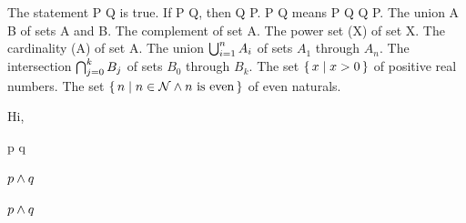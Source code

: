 \documentclass[11pt]{article}
\begin{document}
  The statement P \AND Q is true.
  If P \THEN Q, then \NOT Q \THEN \NOT P.
  P \IFF Q means P \THEN Q \AND Q \THEN P.
    
  The union A \sOR B of sets A and B.
  The complement  of set A.
  The power set \sPOWER(X) of set X.
  The cardinality \sCARD(A) of set A.
    
  The union $\bigcup_{i=1}^{n} A_i$ of sets $A_1$ through $A_n$.
  The intersection $\bigcap_{j=0}^{k} B_j$ of sets $B_0$ through $B_k$.
  The set $\{\,x \mid x > 0\,\}$ of positive real numbers.
  The set $\sBUILD{n}{n \in \mathcal{N} \AND n \text{ is even}}$ of even naturals.

  Hi,

  p \AND q          %


  $p \AND q$        %

  $\AND{p}{q}$      %

  \NOT              %




  \newpage





  







  
\end{document}
